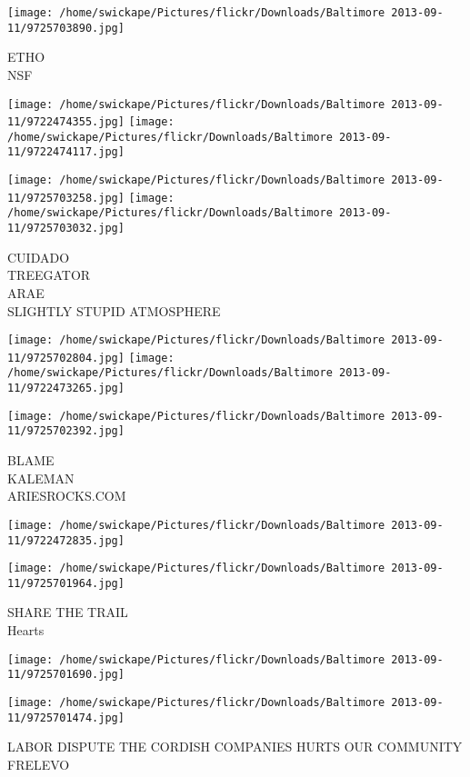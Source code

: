 \documentclass[10pt,letterpaper]{article}
\begin{document}
\vspace{0.25in}
\texttt{[image: /home/swickape/Pictures/flickr/Downloads/Baltimore 2013-09-11/9725703890.jpg]}

ETHO\\
NSF
\pagebreak

\texttt{[image: /home/swickape/Pictures/flickr/Downloads/Baltimore 2013-09-11/9722474355.jpg]}
\texttt{[image: /home/swickape/Pictures/flickr/Downloads/Baltimore 2013-09-11/9722474117.jpg]}

\texttt{[image: /home/swickape/Pictures/flickr/Downloads/Baltimore 2013-09-11/9725703258.jpg]}
\texttt{[image: /home/swickape/Pictures/flickr/Downloads/Baltimore 2013-09-11/9725703032.jpg]}

CUIDADO\\
TREEGATOR\\
ARAE\\
SLIGHTLY STUPID ATMOSPHERE
\pagebreak

\texttt{[image: /home/swickape/Pictures/flickr/Downloads/Baltimore 2013-09-11/9725702804.jpg]}
\texttt{[image: /home/swickape/Pictures/flickr/Downloads/Baltimore 2013-09-11/9722473265.jpg]}

\vspace{0.25in}
\texttt{[image: /home/swickape/Pictures/flickr/Downloads/Baltimore 2013-09-11/9725702392.jpg]}

BLAME\\
KALEMAN\\
ARIESROCKS.COM
\pagebreak

\texttt{[image: /home/swickape/Pictures/flickr/Downloads/Baltimore 2013-09-11/9722472835.jpg]}

\vspace{0.25in}
\texttt{[image: /home/swickape/Pictures/flickr/Downloads/Baltimore 2013-09-11/9725701964.jpg]}

SHARE THE TRAIL\\
Hearts
\pagebreak

\texttt{[image: /home/swickape/Pictures/flickr/Downloads/Baltimore 2013-09-11/9725701690.jpg]}

\vspace{0.25in}
\texttt{[image: /home/swickape/Pictures/flickr/Downloads/Baltimore 2013-09-11/9725701474.jpg]}

LABOR DISPUTE THE CORDISH COMPANIES HURTS OUR COMMUNITY\\
FRELEVO
\pagebreak
\end{document}

